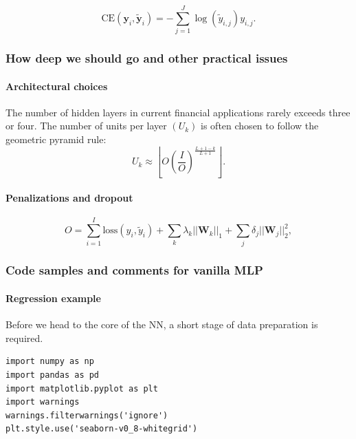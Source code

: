 \begin{equation}
\text{CE}(\textbf{y}_i,\tilde{\textbf{y}}_i)=-\sum_{j=1}^J\log(\tilde{y}_{i,j})y_{i,j}.
\end{equation}

\subsubsection{How deep we should go and other practical issues}\label{howdeep}

\paragraph{Architectural choices}

The number of hidden layers in current financial applications rarely exceeds three or four. The number of units per layer $(U_k)$ is often chosen to follow the geometric pyramid rule:
\begin{equation}
U_k\approx \left\lfloor O\left( \frac{I}{O}\right)^{\frac{L+1-k}{L+1}}\right\rfloor.
\end{equation}

\paragraph{Penalizations and dropout}

\begin{equation}
O=\sum_{i=1}^I \text{loss}(y_i,\tilde{y}_i)+ \sum_{k} \lambda_k||\textbf{W}_k||_1+ \sum_j\delta_j||\textbf{W}_j||_2^2,
\end{equation}

\subsubsection{Code samples and comments for vanilla MLP}

\paragraph{Regression example}

Before we head to the core of the NN, a short stage of data preparation is required.

\begin{verbatim}
import numpy as np
import pandas as pd
import matplotlib.pyplot as plt
import warnings
warnings.filterwarnings('ignore')
plt.style.use('seaborn-v0_8-whitegrid')
\end{verbatim}

